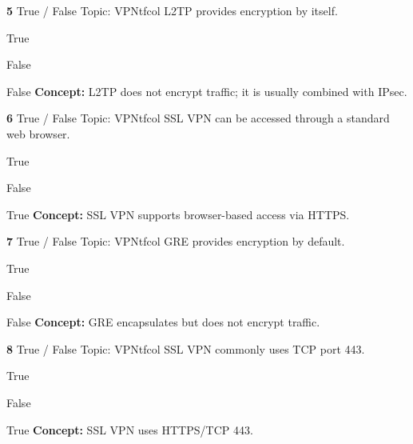 \documentclass[10pt,a4paper]{article}
\begin{document}
\begin{qcard}{\color{white}\textbf{5} \hfill \small True / False \textbar{} Topic: VPN}{tfcol}
L2TP provides encryption by itself.

\begin{qoptions}
\item True
\item False
\end{qoptions}
\begin{explainbox}{False}
\textbf{Concept:} L2TP does not encrypt traffic; it is usually combined with IPsec.
\end{explainbox}
\end{qcard}

\begin{qcard}{\color{white}\textbf{6} \hfill \small True / False \textbar{} Topic: VPN}{tfcol}
SSL VPN can be accessed through a standard web browser.

\begin{qoptions}
\item True
\item False
\end{qoptions}
\begin{explainbox}{True}
\textbf{Concept:} SSL VPN supports browser-based access via HTTPS.
\end{explainbox}
\end{qcard}

\begin{qcard}{\color{white}\textbf{7} \hfill \small True / False \textbar{} Topic: VPN}{tfcol}
GRE provides encryption by default.

\begin{qoptions}
\item True
\item False
\end{qoptions}
\begin{explainbox}{False}
\textbf{Concept:} GRE encapsulates but does not encrypt traffic.
\end{explainbox}
\end{qcard}

\begin{qcard}{\color{white}\textbf{8} \hfill \small True / False \textbar{} Topic: VPN}{tfcol}
SSL VPN commonly uses TCP port 443.

\begin{qoptions}
\item True
\item False
\end{qoptions}
\begin{explainbox}{True}
\textbf{Concept:} SSL VPN uses HTTPS/TCP 443.
\end{explainbox}
\end{qcard}
\end{document}
